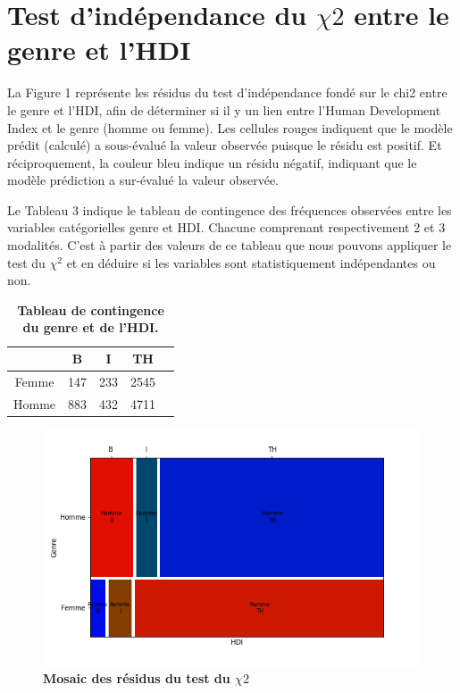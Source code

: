 \documentclass[12pt, a4paper, titlepage, table]{article}
\begin{document}
\section{Test d'indépendance du $\chi2$ entre le genre et l'HDI}

La Figure 1 représente les résidus du test d'indépendance fondé sur le chi2 entre le genre et l'HDI, afin de déterminer si il y un lien entre l'Human Development Index et le genre (homme ou femme).
Les cellules rouges indiquent que le modèle prédit (calculé) a sous-évalué la valeur observée puisque le résidu est positif. Et réciproquement, la couleur bleu indique un résidu négatif, indiquant que le modèle prédiction a sur-évalué la valeur observée. 

Le Tableau 3 indique le tableau de contingence des fréquences observées entre les variables catégorielles genre et HDI. Chacune comprenant respectivement 2 et 3 modalités. C'est à partir des valeurs de ce tableau que nous pouvons appliquer le test du $\chi^2$ et en déduire si les variables sont statistiquement indépendantes ou non.

\begin{table}[H]
	\centering
	\fontsize{10}{12}\selectfont
	\begin{tabular}{|c|l|r|r|r|}
		\hline 
		\multicolumn{1}{|c|}{\textbf{}} & 
		\multicolumn{1}{c|}{\textbf{B}} &
		\multicolumn{1}{c|}{\textbf{I}} &
		\multicolumn{1}{c|}{\textbf{TH}} \\
		\hline
 			Femme&	147&	233&	2545\\
 			Homme&	883&	432&	4711\\
		\hline
	\end{tabular}
\caption{\textbf{Tableau de contingence du genre et de l'HDI.}}
\end{table}

	\begin{figure}[H]
		\centering
		\includegraphics[width=1\textwidth]{../../graph/mosaic_contingence.png}
		\caption{\textbf{Mosaic des résidus du test du $\chi2$}}
	\end{figure}
\end{document}
